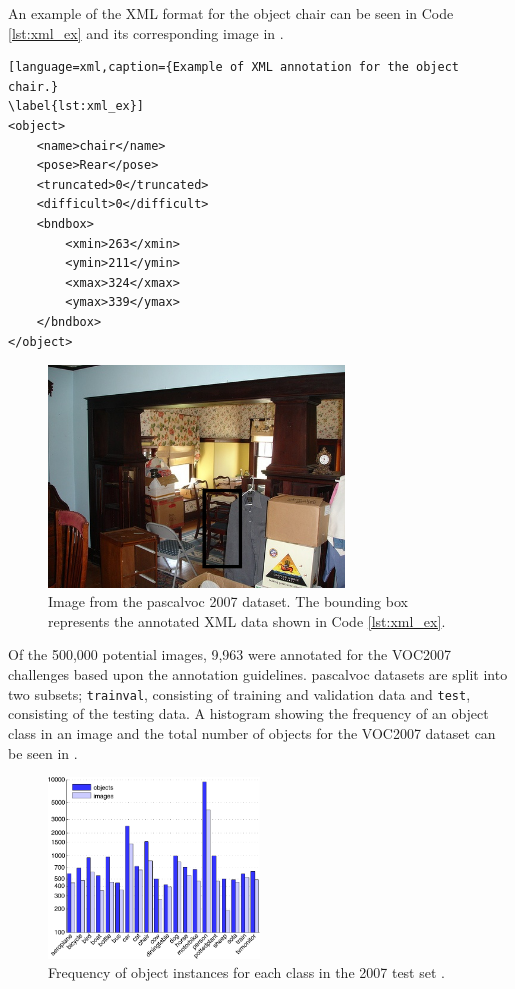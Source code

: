 An example of the XML format for the object chair can be seen in Code \ref{lst:xml_ex} and its corresponding image in . 

\begin{lstlisting}[language=xml,caption={Example of XML annotation for the object chair.}
\label{lst:xml_ex}]
<object>
    <name>chair</name>
    <pose>Rear</pose>
    <truncated>0</truncated>
	<difficult>0</difficult>
	<bndbox>
		<xmin>263</xmin>
		<ymin>211</ymin>
		<xmax>324</xmax>
		<ymax>339</ymax>
	</bndbox>
</object>
\end{lstlisting}

\begin{figure}[H]
  \centering
    \includegraphics[width=0.7\textwidth]{Figs/Techanal/000005.jpg}
    \caption{Image from the \gls{pascalvoc} 2007 dataset. The bounding box represents the annotated XML data shown in Code \ref{lst:xml_ex}.}
    \label{fig:xml_eximg}
\end{figure}

Of the 500,000 potential images, 9,963 were annotated for the VOC2007 challenges based upon the annotation guidelines. \gls{pascalvoc} datasets are split into two subsets; \lstinline{trainval}, consisting of training and validation data and \lstinline{test}, consisting of the testing data. A histogram showing the frequency of an object class in an image and the total number of objects for the VOC2007 dataset can be seen in .

\begin{figure}[H]
  \centering
    \includegraphics[width=0.5\textwidth]{Figs/Techanal/vochist07.png}
    \caption{Frequency of object instances for each class in the 2007 test set \cite{pascalvoc2012}.}
    \label{fig:vochist07}
\end{figure}


